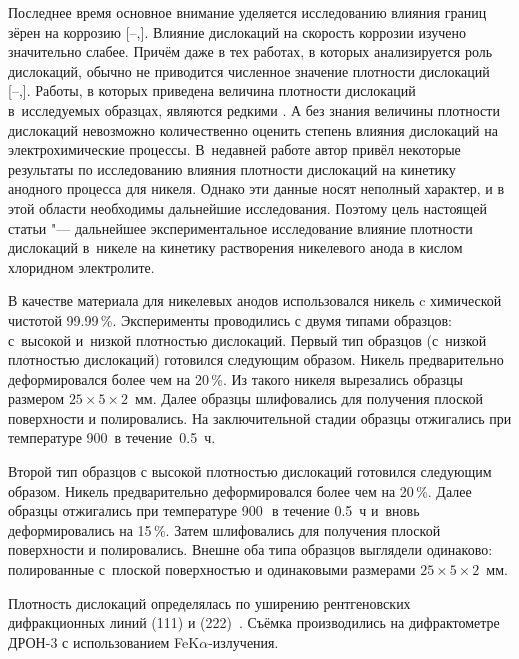 Последнее время основное внимание уделяется исследованию влияния границ зёрен на коррозию [--,]. 
Влияние дислокаций на скорость коррозии изучено значительно слабее. 
Причём даже в тех работах, в которых анализируется роль дислокаций, обычно не приводится численное значение плотности дислокаций [--,]. 
Работы, в которых приведена величина плотности дислокаций в~исследуемых образцах, являются редкими \cite{vasil:bib12,vasil:bib13}. 
А без знания величины плотности дислокаций невозможно количественно оценить степень влияния дислокаций на электрохимические процессы. 
В~недавней работе \cite{vasil:bib14} автор привёл некоторые  результаты по исследованию влияния плотности дислокаций на кинетику анодного процесса для никеля. 
Однако эти данные носят неполный характер, и в этой области необходимы дальнейшие исследования. Поэтому цель настоящей статьи "--- дальнейшее экспериментальное исследование влияние плотности дислокаций в~никеле на кинетику растворения никелевого анода в кислом хлоридном электролите.

\smallskip

В качестве материала для никелевых анодов использовался никель c химической чистотой 99.99\,\%. Эксперименты проводились с двумя типами образцов: с~высокой и~низкой плотностью дислокаций. 
Первый тип образцов (с~низкой плотностью дислокаций) готовился следующим образом. 
Никель предварительно деформировался более чем на 20\,\%. 
Из такого никеля вырезались образцы размером $25 \times 5 \times 2$~мм. 
Далее образцы шлифовались для получения плоской поверхности и полировались. 
На заключительной стадии образцы отжигались при температуре 900\textcelsius\ в течение~0.5~ч.

Второй тип образцов с высокой плотностью дислокаций готовился следующим образом. 
Никель предварительно деформировался более чем на 20\,\%. 
Далее образцы отжигались при температуре 900\,\textcelsius\ в течение 0.5~ч и~вновь деформировались на
15\,\%. 
Затем шлифовались для получения плоской поверхности и полировались.
Внешне оба типа образцов выглядели одинаково: полированные с~плоской поверхностью и одинаковыми размерами \mbox{$25\times 5 \times 2$~мм.}

Плотность дислокаций определялась по уширению рентгеновских дифракционных линий (111) и (222)~\cite{vasil:bib4}. 
Съёмка производились на дифрактометре ДРОН-3 с использованием FeK$\alpha$-излучения.

